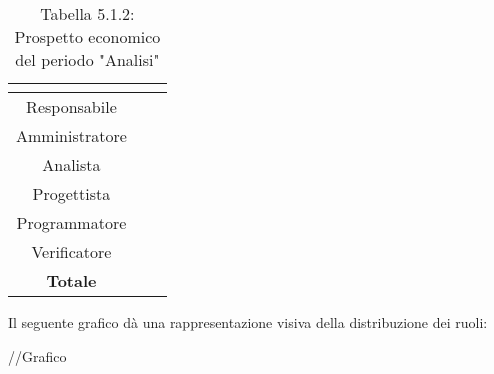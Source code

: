 \renewcommand{\arraystretch}{1.5}
\begin{table}[H]
\begin{center}
\begin{tabular}{|c|c|c|}
\hline
\rowcolor{title_row}
\textbf{\color{title_text}{Ruolo}}  & \textbf{\color{title_text}{Ore}} & \textbf{\color{title_text}{Costo in \euro}} \\ \hline
Responsabile    &              &                     \\ \hline
Amministratore  &              &                     \\ \hline
Analista        &              &                     \\ \hline
Progettista     &              &                     \\ \hline
Programmatore   &              &                     \\ \hline
Verificatore    &              &                     \\ \hline
\textbf{Totale} & \textbf{}    & \textbf{}           \\ \hline
\end{tabular}
\caption{Tabella 5.1.2: Prospetto economico del periodo "Analisi"\label{}}
\end{center}
\end{table}
\renewcommand{\arraystretch}{1}

Il seguente grafico dà una rappresentazione visiva della distribuzione dei ruoli: \\
\begin{center}
//Grafico
\end{center}

\pagebreak
